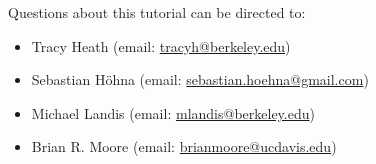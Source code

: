 \vspace{5cm}
Questions about this tutorial can be directed to: \\\vspace{-10mm}
\begin{itemize}
\item Tracy Heath (email: \href{mailto:tracyh@berkeley.edu}{tracyh@berkeley.edu}) \\\vspace{-8mm}
\item Sebastian H\"{o}hna (email: \href{mailto:sebastian.hoehna@gmail.com}{sebastian.hoehna@gmail.com}) \\\vspace{-8mm}
\item Michael Landis (email: \href{mailto:mlandis@berkeley.edu}{mlandis@berkeley.edu}) \\\vspace{-8mm} 
\item Brian R. Moore (email: \href{mailto:brianmoore@ucdavis.edu}{brianmoore@ucdavis.edu}) \\\vspace{-8mm}
\end{itemize}






